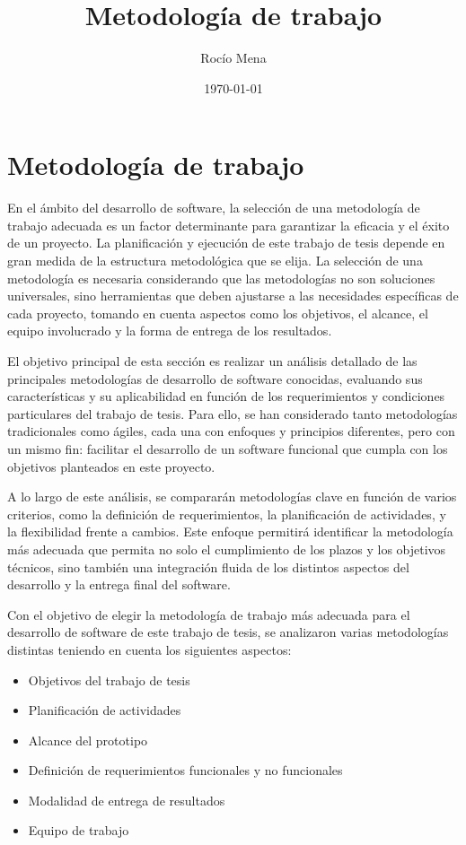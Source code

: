 \documentclass[main.tex]{subfiles}
\title{Metodología de trabajo}
\author{Rocío Mena}
\date{\today}
\begin{document}
\maketitle

\section{Metodología de trabajo}

En el ámbito del desarrollo de software, la selección de una metodología de trabajo adecuada es un factor determinante para garantizar la eficacia y el éxito de un proyecto. La planificación y ejecución de este trabajo de tesis depende en gran medida de la estructura metodológica que se elija. La selección de una metodología es necesaria considerando que las metodologías no son soluciones universales, sino herramientas que deben ajustarse a las necesidades específicas de cada proyecto, tomando en cuenta aspectos como los objetivos, el alcance, el equipo involucrado y la forma de entrega de los resultados.

El objetivo principal de esta sección es realizar un análisis detallado de las principales metodologías de desarrollo de software conocidas, evaluando sus características y su aplicabilidad en función de los requerimientos y condiciones particulares del trabajo de tesis. Para ello, se han considerado tanto metodologías tradicionales como ágiles, cada una con enfoques y principios diferentes, pero con un mismo fin: facilitar el desarrollo de un software funcional que cumpla con los objetivos planteados en este proyecto.

A lo largo de este análisis, se compararán metodologías clave en función de varios criterios, como la definición de requerimientos, la planificación de actividades, y la flexibilidad frente a cambios. Este enfoque permitirá identificar la metodología más adecuada que permita no solo el cumplimiento de los plazos y los objetivos técnicos, sino también una integración fluida de los distintos aspectos del desarrollo y la entrega final del software.

Con el objetivo de elegir la metodología de trabajo más adecuada para el desarrollo de software de este trabajo de tesis, se analizaron varias metodologías distintas teniendo en cuenta los siguientes aspectos:

\begin{itemize}
    \item Objetivos del trabajo de tesis
    \item Planificación de actividades
    \item Alcance del prototipo
    \item Definición de requerimientos funcionales y no funcionales
    \item Modalidad de entrega de resultados
    \item Equipo de trabajo
\end{itemize}
\end{document}
